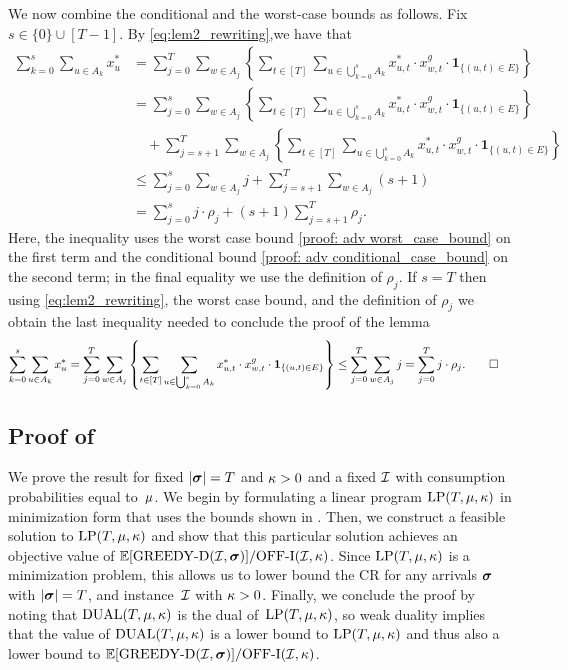         We now  combine the conditional and the worst-case {bounds as follows. Fix} $s \in \{0\} \cup [T-1]$. {By } \eqref{eq:lem2_rewriting},{we have that}
    \begin{align*}
        \sum_{k=0}^s \sum_{u \in A_k} x_u^* &=
         \sum_{j=0}^T \sum_{w \in A_j} \left \{ \sum_{t \in [T]} \sum_{u \in \bigcup_{k=0}^s A_k} x_{u, t}^* \cdot x_{w,t}^g \cdot \bm{1}_{\{(u,t) \in E\}} \right\}  \\
        &= \sum_{j=0}^s \sum_{w \in A_j} \left \{ \sum_{t \in [T]} \sum_{u \in \bigcup_{k=0}^s A_k} x_{u, t}^* \cdot x_{w,t}^g \cdot \bm{1}_{\{(u,t) \in E\}} \right\} \\ &\quad + \sum_{j=s+1}^T \sum_{w \in A_j} \left \{ \sum_{t \in [T]} \sum_{u \in \bigcup_{k=0}^s A_k} x_{u, t}^* \cdot x_{w,t}^g \cdot \bm{1}_{\{(u,t) \in E\}} \right\} \\
        &\leq \sum_{j=0}^s \sum_{w \in A_j} j + \sum_{j=s+1}^{T} \sum_{w \in A_j} (s+1)\\
        &= \sum_{j=0}^s j \cdot \rho_j + (s+1)\sum_{j=s+1}^T \rho_j.
    \end{align*}
    Here, the inequality uses the worst case bound \eqref{proof: adv worst_case_bound} on the first term and the conditional bound \eqref{proof: adv conditional_case_bound} on the second term; in the final equality we use the definition of $\rho_j$.
    If $s = T$ then using \eqref{eq:lem2_rewriting}, the worst case bound, and the definition of $\rho_j$ we obtain the last inequality needed to conclude the proof of the lemma
    \begin{align*}
        \sum_{k=0}^s \sum_{u \in A_k} x_u^* &=
         \sum_{j=0}^T \sum_{w \in A_j} \left \{ \sum_{t \in [T]} \sum_{u \in \bigcup_{k=0}^s A_k} x_{u, t}^* \cdot x_{w,t}^g \cdot \bm{1}_{\{(u,t) \in E\}} \right\} \leq \sum_{j=0}^T \sum_{w \in A_j} j = \sum_{j=0}^T j \cdot \rho_j.\hfill\Halmos
    \end{align*}

\subsection{Proof of }
\label{proof: DLP lower bounds greedy/off}

We prove the result for fixed $|\bm{\sigma}|=T$ and $\kappa>0$ and a fixed $\mathcal I$ with consumption probabilities equal to~$\mu$. We begin by formulating a linear program $\mathrm{LP}(T,\mu, \kappa)$ in minimization form that uses the bounds shown in . Then, we construct a feasible solution to $\mathrm{LP}(T,\mu, \kappa)$ and show that this particular solution achieves an objective value of $\mathbb E[\mathrm{GREEDY\textrm{-}D}(\mathcal I, \bm{\sigma})]/\mathrm{\mathrm{OFF}}\textrm{-}\mathrm{I}(\mathcal I,\kappa)$.  Since $\mathrm{LP}(T,\mu, \kappa)$ is a minimization problem, this allows us to lower bound the CR for any arrivals $\bm{\sigma}$ with $|\bm{\sigma}|=T$, and instance~$\mathcal I$ with $\kappa>0$.  Finally, we conclude the proof by noting that $\mathrm{DUAL}(T, \mu, \kappa)$ is the dual of~$\mathrm{LP}(T,\mu, \kappa)$, so weak duality implies that the value of $\mathrm{DUAL}(T, \mu, \kappa)$ is a lower bound to $\mathrm{LP}(T,\mu, \kappa)$ and thus also a lower bound to $\mathbb E[\mathrm{GREEDY\textrm{-}D}(\mathcal I, \bm{\sigma})]/\mathrm{\mathrm{OFF}}\textrm{-}\mathrm{I}(\mathcal I,\kappa)$.

